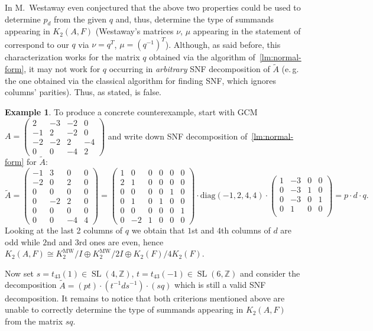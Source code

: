 \documentclass[oneside, 10pt]{amsart}
\theoremstyle{plain}
\theoremstyle{remark}
\theoremstyle{definition}
\newtheorem{example}{Example} \Crefname{example}{Example}{Examples}
\DeclareMathOperator{\SL}{SL}
\newcommand{\ZZ}{\mathbb{Z}}
\newcommand{\K}{K_2}
\newcommand{\Kmw}{K^{\mathrm{MW}}_2}
\begin{document}
In \cite{MW} M.~Westaway even conjectured that the above two properties could be used to determine $p_d$ from the given $q$ and,
 thus, determine the type of summands appearing in $\K(A, F)$
 (Westaway's matrices $\nu$, $\mu$ appearing in the statement of \cite[Conjecture~9.1]{MW} correspond to our $q$ via $\nu = q^T$, $\mu = (q^{-1})^T$).
Although, as said before, this characterization works for the matrix $q$ obtained via the algorithm of~\cref{lm:normal-form},
 it may not work for $q$ occurring in {\it arbitrary} SNF decomposition of $\widetilde{A}$
 (e.\,g. the one obtained via the classical algorithm for finding SNF, which ignores columns' parities).
Thus, as stated, \cite[Conjecture~9.1]{MW} is false.

\begin{example}
To produce a concrete counterexample, start with GCM 
 $A = \left(\begin{smallmatrix}
 2& -3& -2& 0\\
-1& 2& -2& 0\\
-2& -2& 2& -4\\
0& 0& -4& 2\end{smallmatrix}\right)$
  and write down SNF decomposition of~\cref{lm:normal-form} for $\widetilde{A}$:
\[\widetilde{A} = \left(\begin{smallmatrix}
-1& 3& 0& 0\\
-2& 0& 2& 0\\
0& 0& 0& 0\\
0& -2& 2& 0\\
0& 0& 0& 0\\
0& 0& -4& 4
\end{smallmatrix} \right) = \left(\begin{smallmatrix}
1& 0& 0& 0& 0& 0\\
2& 1& 0& 0& 0& 0\\
0& 0& 0& 0& 1& 0\\
0& 1& 0& 1& 0& 0\\
0& 0& 0& 0& 0& 1\\
0& -2& 1& 0& 0& 0\end{smallmatrix}\right) \cdot \mathrm{diag}(-1,2,4,4) \cdot \left(\begin{smallmatrix}
1& -3& 0& 0\\
0& -3& 1& 0\\
0& -3& 0& 1\\
0& 1& 0& 0\\ \end{smallmatrix}\right) = p \cdot d \cdot q.\]
Looking at the last 2 columns of $q$ we obtain that $1$st and $4$th columns of $d$ are odd while $2$nd and $3$rd ones are even,
 hence $\K(A, F) \cong \Kmw/I \oplus \Kmw/2I \oplus \K(F)/4\K(F)$.

Now set $s = t_{43}(1) \in \SL(4, \ZZ)$, $t = t_{43}(-1) \in \SL(6, \ZZ)$ and consider the decomposition 
$\widetilde{A} = (p t) \cdot (t^{-1} d s^{-1}) \cdot (s q)$ which is still a valid SNF decomposition.
It remains to notice that both criterions mentioned above are unable to correctly determine the 
 type of summands appearing in $\K(A, F)$ from the matrix $sq$.
\end{example}

\printbibliography
\end{document}
